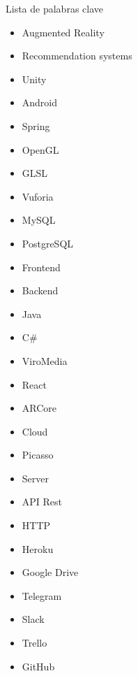      Lista de palabras clave
     \begin{itemize}  
      \item Augmented Reality
      \item Recommendation systems
      \item Unity
      \item Android
      \item Spring
      \item OpenGL
      \item GLSL
      \item Vuforia
      \item MySQL
      \item PostgreSQL
      \item Frontend
      \item Backend
      \item Java
      \item C\#
      \item ViroMedia
      \item React
      \item ARCore
      \item Cloud
      \item Picasso
      \item Server
      \item API Rest
      \item HTTP
      \item Heroku
      \item Google Drive
      \item Telegram
      \item Slack
      \item Trello
      \item GitHub
    \end{itemize}
   


